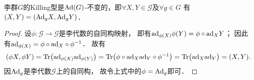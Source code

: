 \begin{proposition}
    李群$G$的Killing型是${\rm Ad}(G)$-不变的，即$\forall X,Y \in \mathscr{G}$及$\forall g\in G$
    有$(X,Y)=({\rm Ad}_g X, {\rm Ad}_g Y )$．
\end{proposition}
\begin{proof}
    设$\phi:\mathscr{G}\to \mathscr{G}$是李代数的自同构映射，
    即有${\rm ad}_{\phi(X)} \phi(Y)= \phi\circ {\rm ad}_X Y$；
    因此有${\rm ad}_{\phi(X)} = \phi\circ {\rm ad}_X \circ \phi^{-1}$．    故有
    \setlength{\mathindent}{0em}
    \begin{align*}
        (\phi X, \phi Y )= {\rm Tr}\bigl( {\rm ad}_{\phi(X)} {\rm ad}_{\phi(Y)}\bigr)
        ={\rm Tr}\bigl( \phi\circ {\rm ad}_X {\rm ad}_Y \circ \phi^{-1}\bigr)
        ={\rm Tr}\bigl( {\rm ad}_X {\rm ad}_Y \bigr) = (X,Y).
    \end{align*}\setlength{\mathindent}{2em}
    因${\rm Ad}_g$是李代数$\mathscr{G}$上的自同构，
    故令上式中的$\phi={\rm Ad}_g$即可．
\end{proof}



